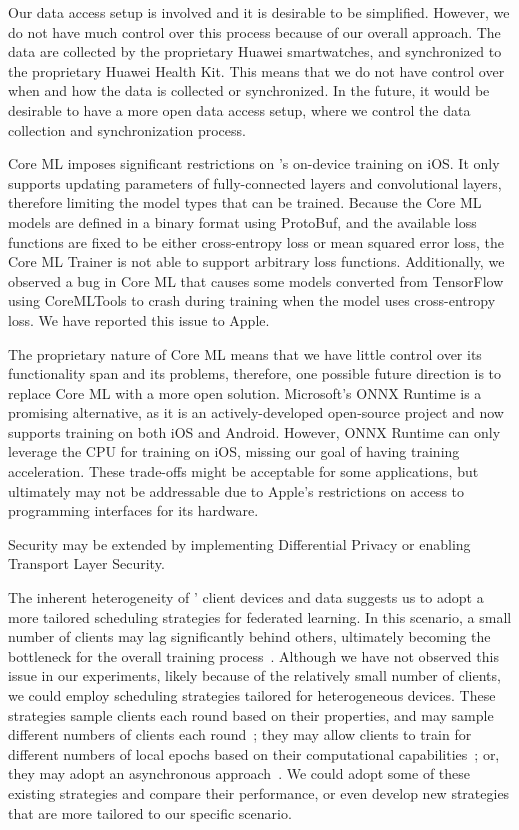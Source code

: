 Our data access setup is involved and it is desirable to be simplified.
However, we do not have much control over this process because of
our overall approach.
The data are collected by the proprietary Huawei smartwatches,
and synchronized to the proprietary Huawei Health Kit.
This means that we do not have control over when and how the data is
collected or synchronized.
In the future, it would be desirable to have a more open data access setup,
where we control the data collection and synchronization process.

Core ML imposes significant restrictions on \fedkit's on-device training on iOS.
It only supports updating parameters of fully-connected layers and convolutional
layers, therefore limiting the model types that can be trained.
Because the Core ML models are defined in a binary format using ProtoBuf,
and the available loss functions are fixed to be either cross-entropy loss or
mean squared error loss, the Core ML Trainer is not able to support arbitrary
loss functions.
Additionally, we observed a bug in Core ML that causes some models converted
from TensorFlow using CoreMLTools to crash during training when the model uses
cross-entropy loss.
We have reported this issue to Apple.

The proprietary nature of Core ML means that we have little control over its
functionality span and its problems, therefore,
one possible future direction is to replace Core ML with a more open solution.
Microsoft's ONNX Runtime is a promising alternative,
as it is an actively-developed open-source project and now supports training on
both iOS and Android.
However, ONNX Runtime can only leverage the CPU for training on iOS,
missing our goal of having training acceleration.
These trade-offs might be acceptable for some applications,
but ultimately may not be addressable due to Apple's restrictions on access to
programming interfaces for its hardware.

Security may be extended by implementing Differential Privacy or
enabling Transport Layer Security.

The inherent heterogeneity of \fedcampus' client devices and data suggests us to
adopt a more tailored scheduling strategies for federated learning.
In this scenario, a small number of clients may lag significantly behind others,
ultimately becoming the bottleneck for the overall training
process~\cite{chen2020asynchronous,zheng2017asynchronous}.
Although we have not observed this issue in our experiments,
likely because of the relatively small number of clients,
we could employ scheduling strategies tailored for heterogeneous devices.
These strategies sample clients each round based on their properties,
and may sample different numbers of clients each
round~\cite[e.g.,][]{zhang2022fedada,karimireddy2019error,reddi2020adaptive,luo2021cost};
they may allow clients to train for different numbers of local epochs based on
their computational capabilities~\cite{li2020federated}; or,
they may adopt an asynchronous
approach~\cite{chilimbi2014project,zhu2022online,huba2022papaya,sun2022fedsea}.
We could adopt some of these existing strategies and compare their performance,
or even develop new strategies that are more tailored to our specific scenario.


